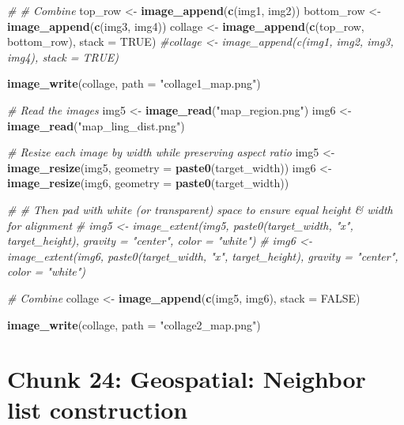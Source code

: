 \documentclass[
]{article}
\newenvironment{Shaded}{\begin{snugshade}}{\end{snugshade}}
\newcommand{\AttributeTok}[1]{\textcolor[rgb]{0.13,0.29,0.53}{#1}}
\newcommand{\CommentTok}[1]{\textcolor[rgb]{0.56,0.35,0.01}{\textit{#1}}}
\newcommand{\ConstantTok}[1]{\textcolor[rgb]{0.56,0.35,0.01}{#1}}
\newcommand{\FunctionTok}[1]{\textcolor[rgb]{0.13,0.29,0.53}{\textbf{#1}}}
\newcommand{\NormalTok}[1]{#1}
\newcommand{\OtherTok}[1]{\textcolor[rgb]{0.56,0.35,0.01}{#1}}
\newcommand{\StringTok}[1]{\textcolor[rgb]{0.31,0.60,0.02}{#1}}
\begin{document}
\begin{Shaded}
\begin{Highlighting}[]
\CommentTok{\# \# Combine}
\NormalTok{top\_row }\OtherTok{\textless{}{-}} \FunctionTok{image\_append}\NormalTok{(}\FunctionTok{c}\NormalTok{(img1, img2))}
\NormalTok{bottom\_row }\OtherTok{\textless{}{-}} \FunctionTok{image\_append}\NormalTok{(}\FunctionTok{c}\NormalTok{(img3, img4))}
\NormalTok{collage }\OtherTok{\textless{}{-}} \FunctionTok{image\_append}\NormalTok{(}\FunctionTok{c}\NormalTok{(top\_row, bottom\_row), }\AttributeTok{stack =} \ConstantTok{TRUE}\NormalTok{)}
\CommentTok{\#collage \textless{}{-} image\_append(c(img1, img2, img3, img4), stack = TRUE)}

\FunctionTok{image\_write}\NormalTok{(collage, }\AttributeTok{path =} \StringTok{"collage1\_map.png"}\NormalTok{)}



\CommentTok{\# Read the images}
\NormalTok{img5 }\OtherTok{\textless{}{-}} \FunctionTok{image\_read}\NormalTok{(}\StringTok{"map\_region.png"}\NormalTok{)}
\NormalTok{img6 }\OtherTok{\textless{}{-}} \FunctionTok{image\_read}\NormalTok{(}\StringTok{"map\_ling\_dist.png"}\NormalTok{)}

\CommentTok{\# Resize each image by width while preserving aspect ratio}
\NormalTok{img5 }\OtherTok{\textless{}{-}} \FunctionTok{image\_resize}\NormalTok{(img5, }\AttributeTok{geometry =} \FunctionTok{paste0}\NormalTok{(target\_width))}
\NormalTok{img6 }\OtherTok{\textless{}{-}} \FunctionTok{image\_resize}\NormalTok{(img6, }\AttributeTok{geometry =} \FunctionTok{paste0}\NormalTok{(target\_width))}

\CommentTok{\# \# Then pad with white (or transparent) space to ensure equal height \& width for alignment}
\CommentTok{\# img5 \textless{}{-} image\_extent(img5, paste0(target\_width, "x", target\_height), gravity = "center", color = "white")}
\CommentTok{\# img6 \textless{}{-} image\_extent(img6, paste0(target\_width, "x", target\_height), gravity = "center", color = "white")}

\CommentTok{\# Combine}
\NormalTok{collage }\OtherTok{\textless{}{-}} \FunctionTok{image\_append}\NormalTok{(}\FunctionTok{c}\NormalTok{(img5, img6), }\AttributeTok{stack =} \ConstantTok{FALSE}\NormalTok{)}

\FunctionTok{image\_write}\NormalTok{(collage, }\AttributeTok{path =} \StringTok{"collage2\_map.png"}\NormalTok{)}
\end{Highlighting}
\end{Shaded}

\section*{Chunk 24: Geospatial: Neighbor list construction}\label{chunk-24-geospatial-neighbor-list-construction}
\end{document}
